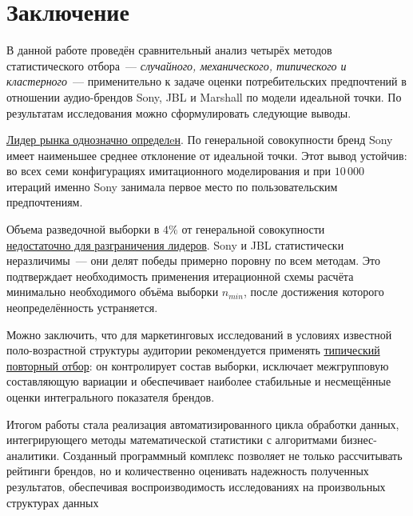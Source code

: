 \section*{Заключение}
 
В данной работе проведён сравнительный анализ четырёх методов статистического
отбора~--- \textit{случайного, механического, типического и кластерного}~--- применительно
к задаче оценки потребительских предпочтений в отношении аудио-брендов
Sony, JBL и Marshall по модели идеальной точки. По результатам исследования
можно сформулировать следующие выводы.

\underline{Лидер рынка однозначно определeн}. По генеральной совокупности
бренд Sony имеет наименьшее среднее отклонение от идеальной точки. Этот
вывод устойчив: во всех семи конфигурациях имитационного моделирования
и при $10\,000$ итераций именно Sony занимала первое место по пользовательским
предпочтениям.
 
Объема разведочной выборки в $4\%$ от генеральной совокупности \\
\underline{недостаточно для разграничения лидеров}.
Sony и JBL статистически
неразличимы~--- они делят победы примерно поровну по всем методам.
Это подтверждает необходимость применения итерационной схемы расчёта
минимально необходимого объёма выборки $n_{min}$, после достижения которого
неопределённость устраняется.
 
Можно заключить, что для маркетинговых исследований в условиях известной
поло-возрастной структуры аудитории рекомендуется применять
\underline{типический повторный отбор}: он контролирует состав выборки,
исключает межгрупповую составляющую вариации и обеспечивает наиболее
стабильные и несмещённые оценки интегрального показателя брендов.
 
Итогом работы стала реализация автоматизированного цикла обработки данных, интегрирующего 
методы математической статистики с алгоритмами бизнес-аналитики. Созданный программный комплекс
позволяет не только рассчитывать рейтинги брендов, но и количественно оценивать надежность 
полученных  результатов, обеспечивая воспроизводимость исследованиях
на произвольных структурах данных
